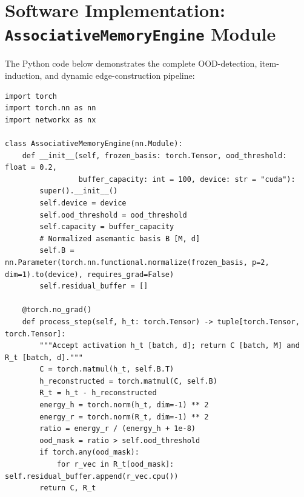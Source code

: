 \documentclass[11pt,a4paper]{article}
\begin{document}
\section{Software Implementation: \texttt{AssociativeMemoryEngine} Module}
The Python code below demonstrates the complete OOD-detection, item-induction, and dynamic edge-construction pipeline:
\begin{lstlisting}
import torch
import torch.nn as nn
import networkx as nx

class AssociativeMemoryEngine(nn.Module):
    def __init__(self, frozen_basis: torch.Tensor, ood_threshold: float = 0.2,
                 buffer_capacity: int = 100, device: str = "cuda"):
        super().__init__()
        self.device = device
        self.ood_threshold = ood_threshold
        self.capacity = buffer_capacity
        # Normalized asemantic basis B [M, d]
        self.B = nn.Parameter(torch.nn.functional.normalize(frozen_basis, p=2, dim=1).to(device), requires_grad=False)
        self.residual_buffer = []

    @torch.no_grad()
    def process_step(self, h_t: torch.Tensor) -> tuple[torch.Tensor, torch.Tensor]:
        """Accept activation h_t [batch, d]; return C [batch, M] and R_t [batch, d]."""
        C = torch.matmul(h_t, self.B.T)
        h_reconstructed = torch.matmul(C, self.B)
        R_t = h_t - h_reconstructed
        energy_h = torch.norm(h_t, dim=-1) ** 2
        energy_r = torch.norm(R_t, dim=-1) ** 2
        ratio = energy_r / (energy_h + 1e-8)
        ood_mask = ratio > self.ood_threshold
        if torch.any(ood_mask):
            for r_vec in R_t[ood_mask]: self.residual_buffer.append(r_vec.cpu())
        return C, R_t


\end{lstlisting}
\end{document}
